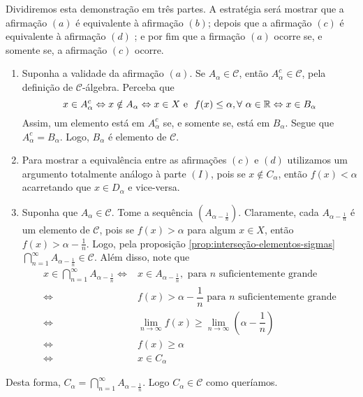 \begin{prova}
    Dividiremos esta demonstração em três partes. A estratégia será mostrar que a afirmação $(a)$ é equivalente à afirmação $(b)$; depois que a afirmação $(c)$ é equivalente à afirmação $(d)$ ; e por fim que a firmação $(a)$ ocorre se, e somente se, a afirmação $(c)$ ocorre. 
    \begin{enumerate}[label* = (\Roman*)]
        \item Suponha a validade da afirmação $(a)$. Se $A_\alpha \in \mathcal{C}$, então $A_\alpha^c \in \mathcal{C}$, pela definição de $\mathcal{C}$-álgebra.
    Perceba que 
    $$
    x \in A_\alpha^c \Leftrightarrow   x \notin A_\alpha\\
    \Leftrightarrow  x \in X \textrm{\ e \ } f(x) \leq \alpha, \forall\ \alpha \in \R
    \Leftrightarrow x \in B_\alpha    
  $$ Assim, um elemento está em $A_\alpha^c$ se, e somente se, está em $B_\alpha$. Segue que $A_\alpha^c = B_\alpha$. Logo, $B_\alpha$ é elemento de $\mathcal{C}$.
  \item Para mostrar a equivalência entre as afirmações $(c)$ e $(d)$ utilizamos um argumento totalmente análogo à parte $(I)$, pois se $x \notin C_\alpha$, então $f(x) < \alpha$ acarretando que $x \in D_\alpha$ e vice-versa.
  \item Suponha que $A_\alpha \in \mathcal{C}$. Tome a sequência $\left(A_{\alpha -\frac{1}{n}}\right)$. Claramente, cada $A_{\alpha - \frac{1}{n}}$ é um elemento de $\mathcal{C}$, pois se $f(x) > \alpha$ para algum $x \in X$, então $f(x) > \alpha -\frac{1}{n}$. Logo, pela proposição \ref{prop:interseção-elementos-sigmas} $\displaystyle \bigcap_{n = 1}^\infty A_{\alpha -\frac{1}{n}} \in \mathcal{C}$. Além disso, note que 
\begin{align*}
    x \in \displaystyle \bigcap_{n = 1}^\infty A_{\alpha -\frac{1}{n}}
    \Leftrightarrow & x \in A_{\alpha - \frac{1}{n}}, \textrm{\ para  $n$ suficientemente grande}\\
    \Leftrightarrow & f(x)> \alpha -\dfrac{1}{n} \textrm{\ para  $n$ suficientemente grande}\\
    \Leftrightarrow &\lim_{n \to \infty} f(x) \geq \lim_{n \to \infty} \left(\alpha - \dfrac{1}{n}\right)\\
    \Leftrightarrow & f(x) \geq \alpha \\
    \Leftrightarrow & x \in C_\alpha
\end{align*}
    \end{enumerate}
Desta forma, $C_\alpha = \displaystyle \bigcap_{n = 1}^\infty A_{\alpha -\frac{1}{n}} $. Logo $C_\alpha \in \mathcal{C}$ como queríamos.


\end{prova}
